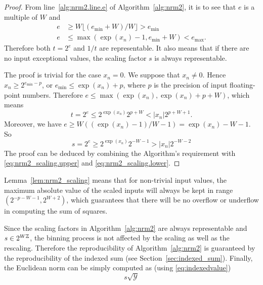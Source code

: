     \begin{proof}
         From line~\ref{alg:nrm2.line.e} of Algorithm~\ref{alg:nrm2}, it is to see that
         $e$ is a multiple of $W$ and
         \[
            \begin{aligned}
                e & \geq W \lfloor(e_{\min} + W) / W\rfloor > e_{\min} \\
                e & \leq \max(\exp(x_n) - 1, e_{\min} + W) < e_{\max}.
            \end{aligned}
         \]
         Therefore both $t=2^e$ and $1/t$ are representable.
         It also means that if there are no input exceptional values, the scaling factor $s$ is always representable.

        The proof is trivial for the case $x_n = 0$. We suppose that $x_n \neq 0$.
        Hence $x_n \geq 2^{e_{\min} - p}$, or $e_{\min} \leq \exp(x_n) + p$,
        where $p$ is the precision of input floating-point numbers.
        Therefore $e \leq \max(\exp(x_n), \exp(x_n) + p + W)$,
        which means
        \begin{equation}
            t = 2^e \leq 2^{\exp(x_n)} 2^{p+W} < |x_n| 2^{p+W+1}.
            \label{eq:nrm2_scaling.upper}
        \end{equation}
        Moreover, we have
        \(
            e \geq W ((\exp(x_n) -  1) / W - 1) = \exp(x_n) - W -1
        \).
        So 
        \begin{equation}
            s = 2^e \geq 2^{\exp(x_n)} 2^{- W - 1} > |x_n| 2^{-W-2}
            \label{eq:nrm2_scaling.lower}
        \end{equation}
        The proof can be deduced by combining the Algorithm's requirement
        with \eqref{eq:nrm2_scaling.upper} and \eqref{eq:nrm2_scaling.lower}.
    \end{proof}

    Lemma~\ref{lem:nrm2_scaling} means that 
    for non-trivial input values, the maximum absolute value of the scaled inputs
    will always be kept in range $(2^{-p-W-1}, 2^{W+2})$, which guarantees that
    there will be no overflow or underflow in computing the sum of squares.

    Since the scaling factors in Algorithm~\ref{alg:nrm2} are always representable and $s \in 2^{W\mathbb{Z}}$,
    the binning process is not affected by the scaling as well as the rescaling.
    Therefore the reproducibility of Algorithm~\ref{alg:nrm2} is guaranteed
    by the reproducibility of the indexed sum (see Section~\ref{sec:indexed_sum}).
    Finally, the Euclidean norm can be simply computed as (using \eqref{eq:indexedvalue})
    \begin{equation}
      s \sqrt{\mathcal{Y}}
    \end{equation}

